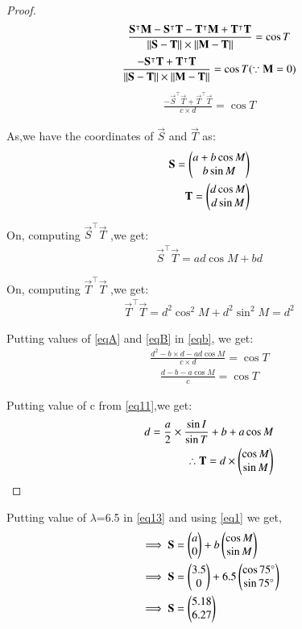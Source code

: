 \documentclass[journal,12pt,twocolumn]{IEEEtran}
\begin{document}
\begin{enumerate}
\begin{proof}
\begin{align}
\frac{\mathbf{S}^\intercal\mathbf{M}-\mathbf{S}^\intercal \mathbf{T}-\mathbf{T}^\intercal\mathbf{M}+\mathbf{T}^\intercal \mathbf{T}}{\Vert\mathbf{S-T}\rVert\times\Vert\mathbf{M-T}\rVert}=\cos T
\end{align}
\begin{align}
\frac{-\mathbf{S}^\intercal \mathbf{T}+\mathbf{T}^\intercal \mathbf{T}}{\Vert\mathbf{S-T}\rVert\times\Vert\mathbf{M-T}\rVert} = \cos T ( \because \mathbf{M}=0) 
\end{align}
\begin{align}
\frac{-\vec{S}^\intercal \vec{T}+\vec{T}^\intercal \vec{T}}{c\times d} =\cos T \label{eqb}
\end{align}
\item As,we have the coordinates of $\vec{S}$ and $\vec{T}$ as:
\begin{align}
    \mathbf{S}=\begin{pmatrix}a+b\cos M\\b\sin M\end{pmatrix}
    \\
    \mathbf{T}=\begin{pmatrix}d\cos M\\d\sin M\end{pmatrix}
\end{align}
\item On, computing $\vec{S}^\intercal \vec{T}$ ,we get:
\begin{align}
\vec{S}^\intercal \vec{T}= ad \cos M + bd \label{eqA}
\end{align}
\item On, computing $\vec{T}^\intercal \vec{T}$ ,we get:
\begin{align}
    \vec{T}^\intercal \vec{T}= d^2\cos^2 M+d^2\sin^2 M=d^2 
    \label{eqB}
\end{align}
\item Putting values of \eqref{eqA} and \eqref{eqB} in \eqref{eqb}, we get:
\begin{align}
\frac{d^2-b\times d-ad\cos M}{c\times d} =\cos T
\end{align}
\begin{align}
\frac{d-b-a\cos M}{c} =\cos T
\end{align}
\item Putting value of c from \eqref{eq11},we get:
\begin{align}
d=\frac{a}{2}\times\frac{\sin I}{\sin T}+ b+a \cos M    \label{eqa}
\\
\therefore \mathbf{T}=d \times{\ensuremath{\begin{pmatrix}\cos M\\ \sin M\end{pmatrix}}}
\end{align}
\end{proof}
\item Putting value of $\lambda$=6.5 in \eqref{eq13} and using \eqref{eq1} we get,
\begin{align}
&\implies \mathbf{S}=\begin{pmatrix}a\\0\end{pmatrix} +b\begin{pmatrix}\cos M \\\sin M\end{pmatrix}
\\
&\implies \mathbf{S}=\begin{pmatrix}3.5\\0\end{pmatrix} +6.5\begin{pmatrix}\cos 75 \degree\\\sin 75 \degree\end{pmatrix} 
\\
&\implies \mathbf{S}=\begin{pmatrix}5.18\\6.27\end{pmatrix}
\end{align}


\end{enumerate}
\end{document}
